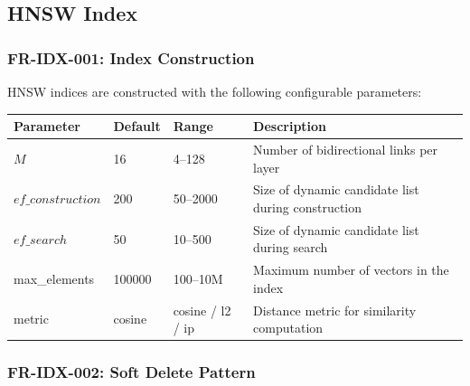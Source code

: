 \documentclass[11pt,a4paper]{article}
\begin{document}
\subsection{HNSW Index}

\subsubsection{FR-IDX-001: Index Construction}

HNSW indices are constructed with the following configurable parameters:

\begin{longtable}{@{}p{3.5cm}p{2cm}p{2cm}p{6.5cm}@{}}
\toprule
\textbf{Parameter} & \textbf{Default} & \textbf{Range} & \textbf{Description} \\
\midrule
\endhead
$M$ & 16 & 4--128 & Number of bidirectional links per layer \\
$ef\_construction$ & 200 & 50--2000 & Size of dynamic candidate list during construction \\
$ef\_search$ & 50 & 10--500 & Size of dynamic candidate list during search \\
max\_elements & 100000 & 100--10M & Maximum number of vectors in the index \\
metric & cosine & cosine / l2 / ip & Distance metric for similarity computation \\
\bottomrule
\end{longtable}

\subsubsection{FR-IDX-002: Soft Delete Pattern}
\end{document}
